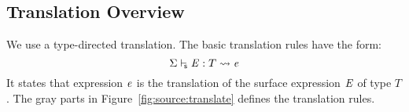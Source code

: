 
\subsection{Translation Overview}

We use a type-directed translation. The basic translation rules have the form:
\[
 \Sigma  \vdash_{\!\!\mathsf{s} }  \mathit{E}  :  T   \rightsquigarrow   \mathit{e} 
\]
It states that \name expression $\mathit{e}$ is the translation of the
surface expression $\mathit{E}$ of type $T$.  The gray parts in
Figure~\ref{fig:source:translate} defines the translation
rules.  

